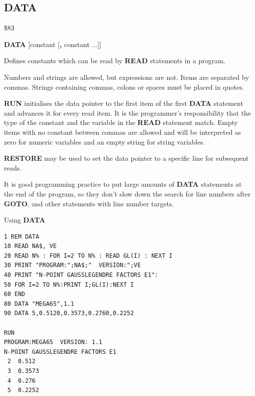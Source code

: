 \subsection{DATA}
\begin{description}[leftmargin=2cm,style=nextline]
\item [Token:] \$83
\item [Format:] {\bf DATA} [constant [{\bf,} constant ...]]
\item [Usage:] Defines constants
               which can be read by {\bf READ} statements
               in a program.

               Numbers and strings are allowed, but expressions are not.
               Items are separated by commas.
               Strings containing commas, colons or spaces must be placed
               in quotes.

               {\bf RUN} initialises the data pointer
               to the first item of the first {\bf DATA} statement
               and advances it for every read item. It is the
               programmer's responsibility that the type of
               the constant and the variable in the {\bf READ}
               statement match. Empty items with no constant
               between commas are allowed and will be interpreted as
               zero for numeric variables and an empty string for
               string variables.

               {\bf RESTORE} may be used to set the
               data pointer to a specific line for subsequent
               reads.

\item [Remarks:] It is good programming practice to put large amounts of
               {\bf DATA} statements at the end of the program,
               so they don't slow down the search for line numbers
               after {\bf GOTO}, and other statements with line number targets.
\item [Example:] Using {\bf DATA}
\begin{tcolorbox}[colback=black,coltext=white]
\verbatimfont{\codefont}
\begin{verbatim}
1 REM DATA
10 READ NA$, VE
20 READ N% : FOR I=2 TO N% : READ GL(I) : NEXT I
30 PRINT "PROGRAM:";NA$;"  VERSION:";VE
40 PRINT "N-POINT GAUSSLEGENDRE FACTORS E1":
50 FOR I=2 TO N%:PRINT I;GL(I):NEXT I
60 END
80 DATA "MEGA65",1.1
90 DATA 5,0.5120,0.3573,0.2760,0.2252

RUN
PROGRAM:MEGA65  VERSION: 1.1
N-POINT GAUSSLEGENDRE FACTORS E1
 2  0.512
 3  0.3573
 4  0.276
 5  0.2252
\end{verbatim}
\end{tcolorbox}
\end{description}


